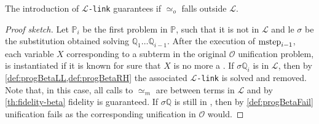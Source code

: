 \documentclass[sigconf,natbib=false,review]{acmart}
\newcommand{\UnifRel}{\ensuremath{\simeq}}
\newcommand{\Uo}{\texorpdfstring{\ensuremath{\UnifRel_o}\xspace}{unif\_o}}
\newcommand{\Ue}{\ensuremath{\UnifRel_m}\xspace}
\newcommand{\llambda}{\ensuremath{\mathcal{L}}\xspace}
\newcommand{\linkMacro}[1]{\ensuremath{#1}\texttt{-link}\xspace}
\newcommand{\linkbeta}{\linkMacro{\llambda}}
\newcommand{\Fo}{\texorpdfstring{\ensuremath{\mathcal{O}\xspace}}{O}} %
\newcommand{\foUnifPb}{\ensuremath{\mathbb{P}}\xspace}
\newcommand{\hoUnifPb}{\ensuremath{\mathbb{Q}}\xspace}
\begin{document}
\begin{theorem}[Fidelity in \Fo]
  The introduction of \linkbeta guarantees 
  if \Uo{} falls outside \llambda.
\end{theorem}

\begin{proof}[Proof sketch]
  Let $\foUnifPb_i$ be the first problem in \foUnifPb, such that it is not in \llambda and le
  $\sigma$ be the substitution obtained solving
  $\hoUnifPb_1\ldots\hoUnifPb_{i-1}$. After the execution of $\mathrm{mstep}_{i-1}$,
  each variable $X$ corresponding to a \maybeeta subterm in the original \Fo 
  unification problem, is instantiated if it is known for sure
  that $X$ is no more a \maybeeta. If $\sigma\hoUnifPb_i$ is in \llambda, then 
  by \cref{def:progBetaLL,def:progBetaRH} the associated \linkbeta
  is solved and removed. Note that, in this case, all
  calls to \Ue{} are between terms in \llambda and by \cref{th:fidelity-beta}
  fidelity is guaranteed. If $\sigma\hoUnifPb$ is still in \notllambda,
  then by \cref{def:progBetaFail} unification fails as the
  corresponding unification in \Fo{} would.
\end{proof}
\end{document}

